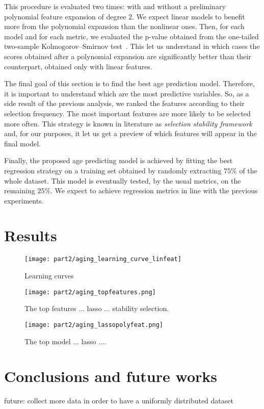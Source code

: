 This procedure is evaluated two times: with and without a preliminary polynomial feature expansion of degree $2$. We expect linear models to benefit more from the polynomial expansion than the nonlinear ones.
Then, for each model and for each metric, we evaluated the p-value obtained from the one-tailed two-sample Kolmogorov–Smirnov test~\cite{everitt2002cambridge}. This let us understand in which cases the scores obtained after a polynomial expansion are significantly better than their counterpart, obtained only with  linear features.

The final goal of this section is to find the best age prediction model. Therefore, it is important to understand which are the most predictive variables.
So, as a side result of the previous analysis, we ranked the features according to their selection frequency. The most important features are more likely to be selected more often. This strategy is known in literature as  \textit{selection stability framework}~\cite{meinshausen2010stability, barbieri16palladio} and, for our purposes, it let us get a preview of which features will appear in the final model.

Finally, the proposed age predicting model is achieved by fitting the best regression strategy on a training set obtained by randomly extracting $75\%$ of the whole dataset. This model is eventually tested, by the usual metrics, on the remaining $25\%$. We expect to achieve regression metrics in line with the previous experiments.

\section{Results} \label{sec:frassoni_results}




\begin{figure}[]
	\centering
	\texttt{[image: part2/aging\_learning\_curve\_linfeat]}
	\caption{Learning curves} \label{fig:frassoni_learning_curves}
\end{figure}


\begin{figure}[]
	\centering
	\texttt{[image: part2/aging\_topfeatures.png]}
	\caption{The top features ... lasso ... stability selection.} \label{fig:frassoni_topfeat}
\end{figure}


\begin{figure}[]
	\centering
	\texttt{[image: part2/aging\_lassopolyfeat.png]}
	\caption{The top model ... lasso ....} \label{fig:frassoni_topmodel}
\end{figure}



\section{Conclusions and future works} \label{sec:frassoni_conclusions}

future: collect more data in order to have a uniformly distributed dataset

